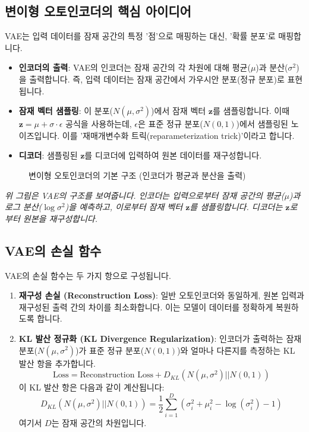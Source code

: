 \documentclass[11pt,a4paper]{article}
\theoremstyle{definition}
\begin{document}
\subsection{변이형 오토인코더의 핵심 아이디어}
VAE는 입력 데이터를 잠재 공간의 특정 '점'으로 매핑하는 대신, '확률 분포'로 매핑합니다.
\begin{itemize}
    \item \textbf{인코더의 출력}: VAE의 인코더는 잠재 공간의 각 차원에 대해 평균($\mu$)과 분산($\sigma^2$)을 출력합니다. 즉, 입력 데이터는 잠재 공간에서 가우시안 분포(정규 분포)로 표현됩니다.
    \item \textbf{잠재 벡터 샘플링}: 이 분포($N(\mu, \sigma^2)$)에서 잠재 벡터 $\mathbf{z}$를 샘플링합니다. 이때 $\mathbf{z} = \mu + \sigma \cdot \epsilon$ 공식을 사용하는데, $\epsilon$은 표준 정규 분포($N(0, 1)$)에서 샘플링된 노이즈입니다. 이를 '재매개변수화 트릭(reparameterization trick)'이라고 합니다.
    \item \textbf{디코더}: 샘플링된 $\mathbf{z}$를 디코더에 입력하여 원본 데이터를 재구성합니다.
\end{itemize}

\begin{figure}[h!]
\centering
\caption{변이형 오토인코더의 기본 구조 (인코더가 평균과 분산을 출력)}
\label{fig:vae_structure}
\end{figure}
\textit{위 그림은 VAE의 구조를 보여줍니다. 인코더는 입력으로부터 잠재 공간의 평균($\mu$)과 로그 분산($\log \sigma^2$)을 예측하고, 이로부터 잠재 벡터 $\mathbf{z}$를 샘플링합니다. 디코더는 $\mathbf{z}$로부터 원본을 재구성합니다.}

\subsection{VAE의 손실 함수}
VAE의 손실 함수는 두 가지 항으로 구성됩니다.
\begin{enumerate}
    \item \textbf{재구성 손실 (Reconstruction Loss)}: 일반 오토인코더와 동일하게, 원본 입력과 재구성된 출력 간의 차이를 최소화합니다. 이는 모델이 데이터를 정확하게 복원하도록 합니다.
    \item \textbf{KL 발산 정규화 (KL Divergence Regularization)}: 인코더가 출력하는 잠재 분포($N(\mu, \sigma^2)$)가 표준 정규 분포($N(0, 1)$)와 얼마나 다른지를 측정하는 KL 발산 항을 추가합니다.
        \begin{equation*}
        \text{Loss} = \text{Reconstruction Loss} + D_{KL}(N(\mu, \sigma^2) || N(0, 1))
        \end{equation*}
        이 KL 발산 항은 다음과 같이 계산됩니다:
        \begin{equation*}
        D_{KL}(N(\mu, \sigma^2) || N(0, 1)) = \frac{1}{2} \sum_{i=1}^{D} (\sigma_i^2 + \mu_i^2 - \log(\sigma_i^2) - 1)
        \end{equation*}
        여기서 $D$는 잠재 공간의 차원입니다.
\end{enumerate}
\end{document}
